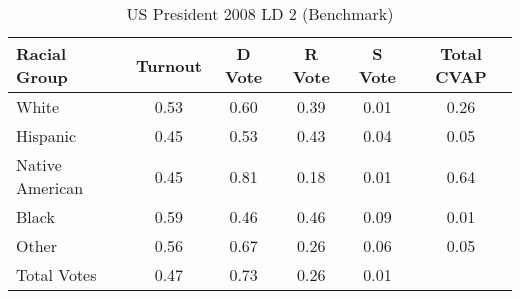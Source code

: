 \begin{table}[htb]
\begin{center}
\caption{US President 2008 LD 2 (Benchmark)}
\label{pres08_cvap_ld_2_benchmark}
\begin{tabular}{lccccc}
  \hline
Racial Group & Turnout & D Vote & R Vote & S Vote & Total CVAP \\ 
  \hline
White & 0.53 & 0.60 & 0.39 & 0.01 & 0.26 \\ 
  Hispanic & 0.45 & 0.53 & 0.43 & 0.04 & 0.05 \\ 
  Native American & 0.45 & 0.81 & 0.18 & 0.01 & 0.64 \\ 
  Black & 0.59 & 0.46 & 0.46 & 0.09 & 0.01 \\ 
  Other & 0.56 & 0.67 & 0.26 & 0.06 & 0.05 \\ 
  Total Votes & 0.47 & 0.73 & 0.26 & 0.01 &  \\ 
   \hline
\end{tabular}
\end{center}
\end{table}
